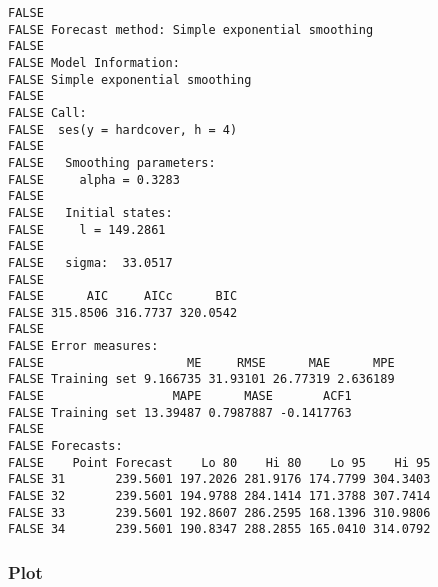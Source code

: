 \documentclass[openany]{book}
\begin{document}
\begin{verbatim}
FALSE 
FALSE Forecast method: Simple exponential smoothing
FALSE 
FALSE Model Information:
FALSE Simple exponential smoothing 
FALSE 
FALSE Call:
FALSE  ses(y = hardcover, h = 4) 
FALSE 
FALSE   Smoothing parameters:
FALSE     alpha = 0.3283 
FALSE 
FALSE   Initial states:
FALSE     l = 149.2861 
FALSE 
FALSE   sigma:  33.0517
FALSE 
FALSE      AIC     AICc      BIC 
FALSE 315.8506 316.7737 320.0542 
FALSE 
FALSE Error measures:
FALSE                    ME     RMSE      MAE      MPE
FALSE Training set 9.166735 31.93101 26.77319 2.636189
FALSE                  MAPE      MASE       ACF1
FALSE Training set 13.39487 0.7987887 -0.1417763
FALSE 
FALSE Forecasts:
FALSE    Point Forecast    Lo 80    Hi 80    Lo 95    Hi 95
FALSE 31       239.5601 197.2026 281.9176 174.7799 304.3403
FALSE 32       239.5601 194.9788 284.1414 171.3788 307.7414
FALSE 33       239.5601 192.8607 286.2595 168.1396 310.9806
FALSE 34       239.5601 190.8347 288.2855 165.0410 314.0792
\end{verbatim}

\hypertarget{plot}{%
\subsubsection{Plot}\label{plot}}
\end{document}
